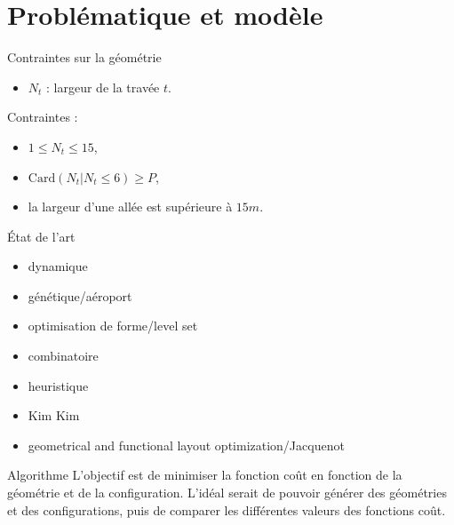 \section{Problématique et modèle}

\begin{frame}{Contraintes sur la géométrie}
  \vfill 
  \begin{itemize}
  \item $N_t$ : largeur de la travée $t$.
  \end{itemize} 
  \vfill
  Contraintes : 
  \vfill
  \begin{itemize}
  \item $1 \leq N_t \leq 15$,
    \vfill
  \item $\mathrm{Card}(N_t\vert N_t \leq  6) \geq  P$,
    \vfill
  \item la largeur d'une allée est supérieure à $15m$.
    \vfill
  \end{itemize}   
  \vfill
\end{frame}

\begin{frame}{\'Etat de l'art}
  \begin{itemize}
  \item dynamique \cite{rekik2015}
  \item génétique/aéroport \cite{gotteland2004}
  \item optimisation de forme/level set \cite{allaire2006}
  \item combinatoire \cite{moussi2012}
  \item heuristique \cite{ndiaye2015}
  \item Kim Kim \cite{kim98}
  \item geometrical and functional layout optimization/Jacquenot \cite{jacquenot2010}
  \end{itemize}
\end{frame}

\begin{frame}{Algorithme}
  \vfill
  L'objectif est de minimiser la fonction coût en fonction de la géométrie et de la configuration.
  \vfill
  L'idéal serait de pouvoir générer des géométries et des configurations, puis de comparer les différentes valeurs des fonctions coût. 
  \vfill  
\end{frame}

